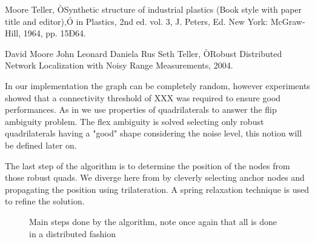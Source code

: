 \documentclass[letterpaper, 10 pt, conference]{ieeeconf}  %
\begin{document}
\begin{thebibliography}{99}

 Moore Teller, ÒSynthetic structure of industrial plastics (Book style with paper title and editor),Ó 	in Plastics, 2nd ed. vol. 3, J. Peters, Ed.  New York: McGraw-Hill, 1964, pp. 15Ð64.

 David Moore John Leonard Daniela Rus Seth Teller, ÒRobust Distributed Network Localization with Noisy Range Measurements, 2004.




\end{thebibliography}








In our implementation the graph can be completely random, however experiments showed that a connectivity threshold of XXX was required to ensure good performances. As in \cite{MooreTeller} we use properties of quadrilaterals to answer the flip ambiguity problem. The flex ambiguity is solved selecting only robust quadrilaterals having a "good" shape considering the noise level, this notion will be defined later on. 

The last step of the algorithm is to determine the position of the nodes from those robust quads. We diverge here from \cite{MooreTeller} by cleverly selecting anchor nodes and propagating the position using trilateration. A spring relaxation technique is used to refine the solution. 

   \begin{figure}[thpb]
      \centering
      \caption{Main steps done by the algorithm, note once again that all is done in a distributed fashion}
      \label{figurelabel}
   \end{figure}
\end{document}
